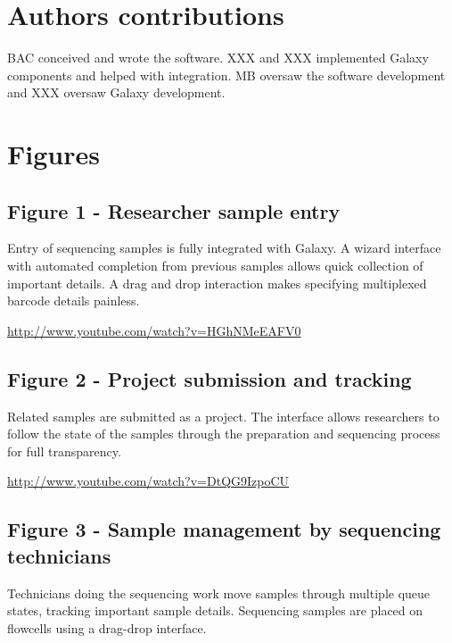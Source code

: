 \documentclass[10pt]{bmc_article}
\newenvironment{bmcformat}{\begin{raggedright}\baselineskip20pt\sloppy\setboolean{publ}{false}}{\end{raggedright}\baselineskip20pt\sloppy}
\begin{document}
\begin{bmcformat}
\section*{Authors contributions}

BAC conceived and wrote the software. XXX and XXX implemented
Galaxy components and helped with integration. MB oversaw the software
development and XXX oversaw Galaxy development.


{
   }  %


\section*{Figures}
\subsection*{Figure 1 - Researcher sample entry}
Entry of sequencing samples is fully integrated with Galaxy. A
wizard interface with automated completion from previous samples
allows quick collection of important details. A drag and drop
interaction makes specifying multiplexed barcode details painless.

\url{http://www.youtube.com/watch?v=HGhNMeEAFV0}

\subsection*{Figure 2 - Project submission and tracking}
Related samples are submitted as a project. The interface allows
researchers to follow the state of the samples through the
preparation and sequencing process for full transparency.

\url{http://www.youtube.com/watch?v=DtQG9IzpoCU}

\subsection*{Figure 3 - Sample management by sequencing technicians}
Technicians doing the sequencing work move samples through multiple
queue states, tracking important sample details. Sequencing samples
are placed on flowcells using a drag-drop interface.


\end{bmcformat}
\end{document}
